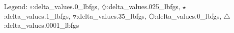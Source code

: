 Legend: {\color{NavyBlue}$\circ$}:delta\_values\0.0\_lbfgs, {\color{Magenta}$\diamondsuit$}:delta\_values\0.025\_lbfgs, {\color{Orange}$\star$}:delta\_values\0.1\_lbfgs, {\color{CornflowerBlue}$\triangledown$}:delta\_values\0.35\_lbfgs, {\color{red}$\varhexagon$}:delta\_values\1.0\_lbfgs, {\color{YellowGreen}$\triangle$}:delta\_values\0.0001\_lbfgs